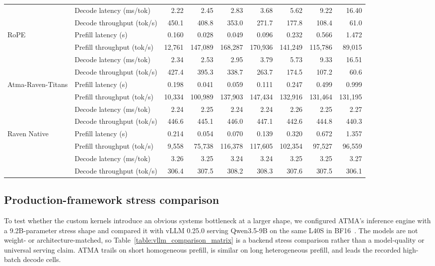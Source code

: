 \begin{landscape}
\begin{longtable}{llrrrrrrr}
& Decode latency (ms/tok) & 2.22 & 2.45 & 2.83 & 3.68 & 5.62 & 9.22 & 16.40 \\
& Decode throughput (tok/s) & 450.1 & 408.8 & 353.0 & 271.7 & 177.8 & 108.4 & 61.0 \\
\midrule
RoPE & Prefill latency (s) & 0.160 & 0.028 & 0.049 & 0.096 & 0.232 & 0.566 & 1.472 \\
& Prefill throughput (tok/s) & 12,761 & 147,089 & 168,287 & 170,936 & 141,249 & 115,786 & 89,015 \\
& Decode latency (ms/tok) & 2.34 & 2.53 & 2.95 & 3.79 & 5.73 & 9.33 & 16.51 \\
& Decode throughput (tok/s) & 427.4 & 395.3 & 338.7 & 263.7 & 174.5 & 107.2 & 60.6 \\
\midrule
Atma-Raven-Titans & Prefill latency (s) & 0.198 & 0.041 & 0.059 & 0.111 & 0.247 & 0.499 & 0.999 \\
& Prefill throughput (tok/s) & 10,334 & 100,989 & 137,903 & 147,434 & 132,916 & 131,464 & 131,195 \\
& Decode latency (ms/tok) & 2.24 & 2.25 & 2.24 & 2.24 & 2.26 & 2.25 & 2.27 \\
& Decode throughput (tok/s) & 446.6 & 445.1 & 446.0 & 447.1 & 442.6 & 444.8 & 440.3 \\
\midrule
Raven Native & Prefill latency (s) & 0.214 & 0.054 & 0.070 & 0.139 & 0.320 & 0.672 & 1.357 \\
& Prefill throughput (tok/s) & 9,558 & 75,738 & 116,378 & 117,605 & 102,354 & 97,527 & 96,559 \\
& Decode latency (ms/tok) & 3.26 & 3.25 & 3.24 & 3.24 & 3.25 & 3.25 & 3.27 \\
& Decode throughput (tok/s) & 306.4 & 307.5 & 308.2 & 308.3 & 307.6 & 307.5 & 306.1 \\
\end{longtable}
\endgroup
\end{landscape}

\subsection{Production-framework stress comparison}
To test whether the custom kernels introduce an obvious systems bottleneck at a larger shape, we configured ATMA's inference engine with a 9.2B-parameter stress shape and compared it with vLLM 0.25.0 serving Qwen3.5-9B on the same L40S in BF16~\citep{kwon2023vllm}. The models are not weight- or architecture-matched, so Table~\ref{table:vllm_comparison_matrix} is a backend stress comparison rather than a model-quality or universal serving claim. ATMA trails on short homogeneous prefill, is similar on long heterogeneous prefill, and leads the recorded high-batch decode cells.

